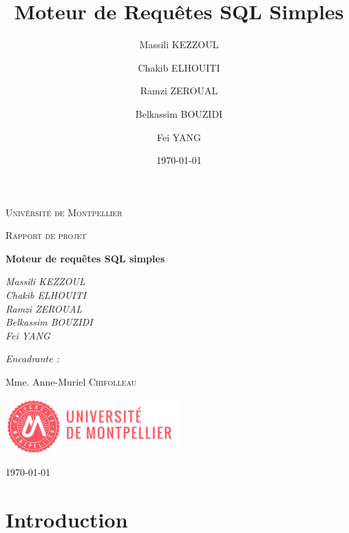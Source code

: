 \documentclass[oneside,13pt,a4paper]{report}
\title{Moteur de Requêtes SQL Simples}
\author{
    Massili KEZZOUL \and
    Chakib ELHOUITI \and
    Ramzi ZEROUAL \and
    Belkassim BOUZIDI \and
    Fei YANG
}
\date{\today}
\begin{document}
    \begin{titlepage}
        \centering
        {\scshape\LARGE Univérsité de Montpellier\par}
        {\scshape\Large Rapport de projet\par}
        \vspace{1.5cm}
        {\huge\bfseries Moteur de requêtes SQL simples\par}
        \vspace{2cm}
        {\Large\itshape
            Massili KEZZOUL \\
            Chakib ELHOUITI \\
            Ramzi ZEROUAL \\
            Belkassim BOUZIDI \\
            Fei YANG \\
        \par}

        \vspace{1.5cm}

        {\Large\itshape
            Encadrante :\par
            Mme. Anne-Muriel \textsc{Chifolleau}
        \par}

        \vspace{2cm}

        \includegraphics[width=0.5\textwidth]{img/univ-montpellier.png}\par\vspace{1cm}

        \vfill

        {\large \today\par}
    \end{titlepage}

    \tableofcontents

\parskip=5pt


    \chapter{Introduction}
\end{document}
